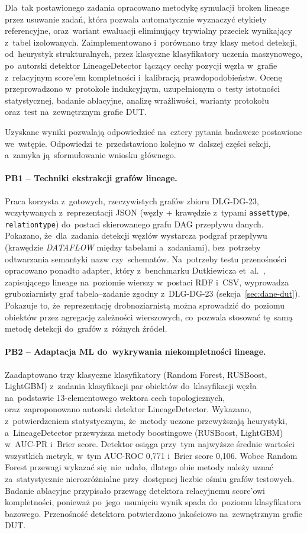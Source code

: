 \documentclass[polish,master,a4paper,oneside]{ppfcmthesis}
\renewcommand{\_}{\origtextunderscore\ifmmode\else\allowbreak\fi}
\begin{document}
Dla~tak postawionego zadania opracowano metodykę symulacji broken lineage
przez usuwanie zadań, która pozwala automatycznie wyznaczyć etykiety
referencyjne, oraz~wariant ewaluacji eliminujący trywialny przeciek wynikający
z~tabel izolowanych. Zaimplementowano i~porównano trzy klasy metod detekcji,
od~heurystyk strukturalnych, przez klasyczne klasyfikatory uczenia maszynowego,
po~autorski detektor LineageDetector łączący cechy pozycji węzła w~grafie
z~relacyjnym score'em kompletności i~kalibracją prawdopodobieństw. Ocenę
przeprowadzono w~protokole indukcyjnym, uzupełnionym o~testy istotności
statystycznej, badanie ablacyjne, analizę wrażliwości, warianty protokołu
oraz~test na~zewnętrznym grafie DUT.

Uzyskane wyniki pozwalają odpowiedzieć na~cztery pytania badawcze postawione
we~wstępie. Odpowiedzi te~przedstawiono kolejno w~dalszej części sekcji,
a~zamyka ją~sformułowanie wniosku głównego.

\paragraph{PB1 – Techniki ekstrakcji grafów lineage.}
Praca korzysta z~gotowych, rzeczywistych grafów zbioru DLG-DG-23, wczytywanych
z~reprezentacji JSON (węzły + krawędzie z~typami \texttt{asset\_type},
\texttt{relation\_type}) do~postaci skierowanego grafu DAG przepływu danych.
Pokazano, że~dla~zadania detekcji węzłów wystarcza podgraf przepływu (krawędzie
\emph{DATA\_FLOW} między tabelami a~zadaniami), bez~potrzeby odtwarzania
semantyki nazw czy~schematów. Na~potrzeby testu przenośności opracowano
ponadto adapter, który z~benchmarku Dutkiewicza et~al.~\cite{Dutkiewicz2026},
zapisującego lineage na~poziomie wierszy w~postaci RDF i~CSV, wyprowadza
gruboziarnisty graf tabela–zadanie zgodny z~DLG-DG-23
(sekcja~\ref{sec:dane-dut}). Pokazuje to, że~reprezentację drobnoziarnistą
można sprowadzić do~poziomu obiektów przez agregację zależności wierszowych,
co~pozwala stosować tę~samą metodę detekcji do~grafów z~różnych źródeł.

\paragraph{PB2 – Adaptacja ML do~wykrywania niekompletności lineage.}
Zaadaptowano trzy klasyczne klasyfikatory (Random Forest, RUSBoost, LightGBM)
z~zadania klasyfikacji par obiektów do~klasyfikacji węzła na~podstawie
13-elementowego wektora cech topologicznych, oraz~zaproponowano autorski
detektor LineageDetector. Wykazano, z~potwierdzeniem statystycznym, że~metody
uczone przewyższają heurystyki, a~LineageDetector przewyższa metody
boostingowe (RUSBoost, LightGBM) w~AUC-PR i~Brier score. Detektor osiąga
przy~tym najwyższe średnie wartości wszystkich metryk, w~tym AUC-ROC 0{,}771
i~Brier score 0{,}106. Wobec Random Forest
przewagi wykazać się~nie~udało, dlatego obie metody należy uznać za~statystycznie
nierozróżnialne przy~dostępnej liczbie ośmiu grafów testowych. Badanie
ablacyjne przypisało przewagę detektora relacyjnemu score'owi kompletności,
ponieważ po~jego~usunięciu wynik spada do~poziomu klasyfikatora bazowego.
Przenośność detektora potwierdzono jakościowo na~zewnętrznym grafie DUT.
\end{document}
